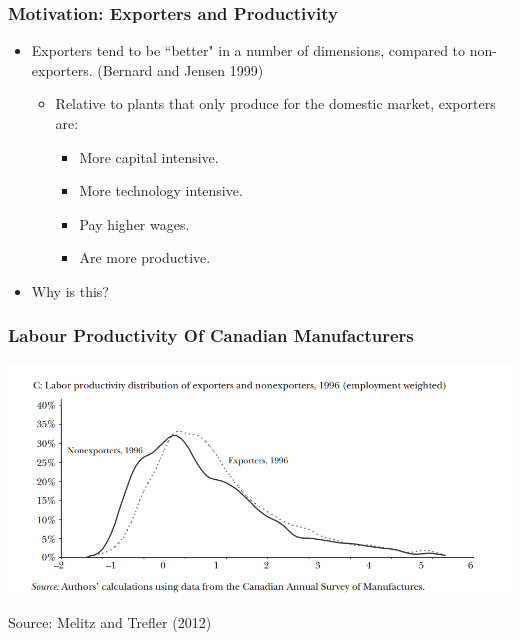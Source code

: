 \documentclass{beamer}
\begin{document}
\begin{frame}
	\frametitle{Motivation: Exporters and Productivity}
	
\begin{itemize}
	\item Exporters tend to be ``better" in a number of dimensions, compared to non-exporters. (Bernard and Jensen 1999)
		\begin{itemize}
			\item Relative to plants that only produce for the domestic market, exporters are:
				\begin{itemize}
					\item More capital intensive.
					\item More technology intensive.
					\item Pay higher wages.
					\item Are more productive.
				\end{itemize}
		\end{itemize}
	\item Why is this?

\end{itemize}
\end{frame}

\begin{frame}
	\frametitle{Labour Productivity Of Canadian Manufacturers}

			\includegraphics[scale=0.48]{SL4_productivity.png}
			
			\begin{center}
				\scriptsize
				Source: Melitz and Trefler (2012)
			\end{center}

			

\end{frame}
\end{document}
